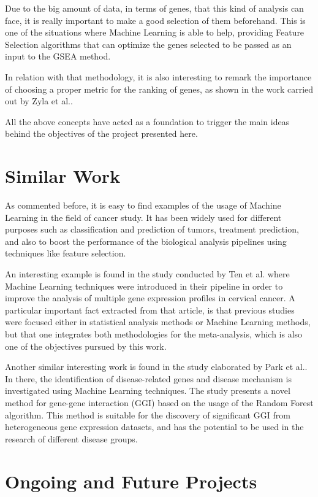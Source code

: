 Due to the big amount of data, in terms of genes, that this kind of analysis can face, it is really important to make a good selection of them beforehand. This is one of the situations where Machine Learning is able to help, providing Feature Selection algorithms that can optimize the genes selected to be passed as an input to the GSEA method.

In relation with that methodology, it is also interesting to remark the importance of choosing a proper metric for the ranking of genes, as shown in the work carried out by Zyla et al.\cite{Zyla2017}.

All the above concepts have acted as a foundation to trigger the main ideas behind the objectives of the project presented here.

\section{Similar Work}

As commented before, it is easy to find examples of the usage of Machine Learning in the field of cancer study. It has been widely used for different purposes such as classification\cite{Chuang2007} and prediction of tumors, treatment prediction, and also to boost the performance of the biological analysis pipelines using techniques like feature selection\cite{SINGH201552}\cite{Bashiri2017}.

An interesting example is found in the study conducted by Ten et al.\cite{Tan2018} where Machine Learning techniques were introduced in their pipeline in order to improve the analysis of multiple gene expression profiles in cervical cancer.
A particular important fact extracted from that article, is that previous studies were focused either in statistical analysis methods or Machine Learning methods, but that one integrates both methodologies for the meta-analysis, which is also one of the objectives pursued by this work.

Another similar interesting work is found in the study elaborated by Park et al.\cite{Park2018}. In there, the identification of disease-related genes and disease mechanism is investigated using Machine Learning techniques. The study presents a novel method for gene-gene interaction (GGI) based on the usage of the Random Forest algorithm. This method is suitable for the discovery of significant GGI from heterogeneous gene expression datasets, and has the potential to be used in the research of different disease groups.

\section{Ongoing and Future Projects}

